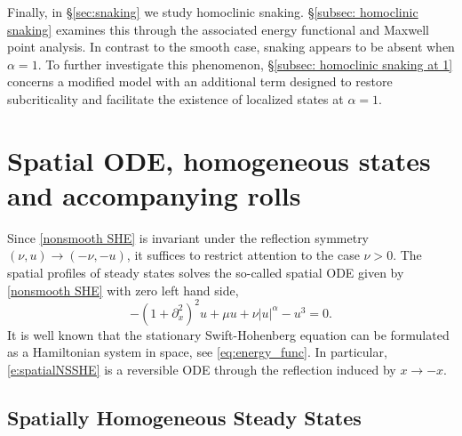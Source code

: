\documentclass{article}
\numberwithin{equation}{section}
\begin{document}
Finally, in \S\ref{sec:snaking} we study homoclinic snaking. \S\ref{subsec: homoclinic snaking} examines this through the associated energy functional and Maxwell point analysis. In contrast to the smooth case, snaking appears to be absent when $\alpha=1$. To further investigate this phenomenon, \S\ref{subsec: homoclinic snaking at 1} concerns a modified model with an additional term designed to restore subcriticality and facilitate the existence of localized states at $\alpha=1$.




\section{Spatial ODE, homogeneous states and accompanying rolls}\label{sec:homrolls}
	
	Since \eqref{nonsmooth SHE} is invariant under the reflection symmetry $(\nu,u) \rightarrow (-\nu,-u)$, it suffices to restrict attention to the case $\nu >0$. The spatial profiles of steady states solves the so-called spatial ODE given by \eqref{nonsmooth SHE} with zero left hand side,
\begin{equation} \label{e:spatialNSSHE}
 -(1+\partial_x^2)^2 u + \mu u + \nu |u|^{\alpha} -u^3 =0.
\end{equation}
It is well known that 
 the stationary Swift-Hohenberg equation can be formulated as a Hamiltonian system in space, see \eqref{eq:energy_func}. In particular,  \eqref{e:spatialNSSHE} is a reversible ODE \cite{MR402815} through the reflection induced by $x\to-x$.
	
	
	
	
	
	
	
\subsection{Spatially Homogeneous Steady States}\label{sec:homostates}
			
\end{document}
